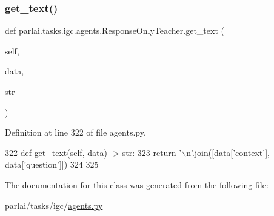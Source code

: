 \subsubsection{\texorpdfstring{get\+\_\+text()}{get\_text()}}
{\footnotesize\ttfamily def parlai.\+tasks.\+igc.\+agents.\+Response\+Only\+Teacher.\+get\+\_\+text (\begin{DoxyParamCaption}\item[{}]{self,  }\item[{}]{data,  }\item[{}]{str }\end{DoxyParamCaption})}



Definition at line 322 of file agents.\+py.


\begin{DoxyCode}
322     \textcolor{keyword}{def }get\_text(self, data) -> str:
323         \textcolor{keywordflow}{return} \textcolor{stringliteral}{'\(\backslash\)n'}.join([data[\textcolor{stringliteral}{'context'}], data[\textcolor{stringliteral}{'question'}]])
324 
325 
\end{DoxyCode}


The documentation for this class was generated from the following file\+:\begin{DoxyCompactItemize}
\item 
parlai/tasks/igc/\hyperlink{parlai_2tasks_2igc_2agents_8py}{agents.\+py}\end{DoxyCompactItemize}
